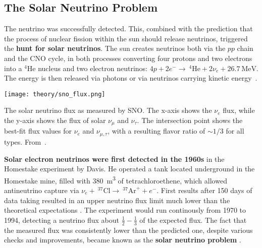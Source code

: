 \subsection{The Solar Neutrino Problem}

The neutrino was successfully detected. This, combined with the prediction that the process of nuclear fission within the sun should release neutrinos, triggered the \textbf{hunt for solar neutrinos}. The sun creates neutrinos both via the $pp$ chain and the CNO cycle, in both processes converting four protons and two electrons into a $^4\text{He}$ nucleus and two electron neutrinos: $4p + 2e^- \rightarrow  ~^4\text{He} + 2\nu_e + \SI{26.7}{\mega\eV}$. The energy is then released via photons or via neutrinos carrying kinetic energy~\cite{Giunti2007}.

\begin{marginfigure}
    \texttt{[image: theory/sno\_flux.png]}
    \caption[Solar neutrino flux measured by SNO]{The solar neutrino flux as measured by SNO\@. The x-axis shows the $\nu_e$ flux, while the y-axis shows the flux of solar $\nu_\mu$ and $\nu_\tau$. The intersection point shows the best-fit flux values for $\nu_e$ and $\nu_{\mu,\tau}$, with a resulting flavor ratio of $\sim1/3$ for all types. From~\cite{Ahmad2002}.}
\end{marginfigure}

\textbf{Solar electron neutrinos were first detected in the 1960s} in the Homestake experiment by Davis. He operated a tank located underground in the Homestake mine, filled with \SI{380}{\meter\cubed} of tetrachloroethene, which allowed antineutrino capture via $\nu_e +~ ^{37}\text{Cl} \rightarrow ~ ^{37}\text{Ar}^+ + e^-$. First results after 150 days of data taking resulted in an upper neutrino flux limit much lower than the theoretical expectations . The experiment would run continously from 1970 to 1994, detecting a neutrino flux about $\frac{1}{2}-\frac{1}{3}$ of the expected flux. The fact that the measured flux was consistently lower than the predicted one, despite various checks and improvements, became known as the \textbf{solar neutrino problem} .

